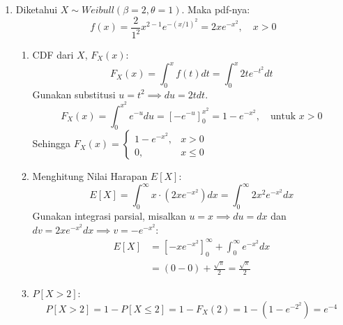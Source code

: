 \documentclass[11pt,letterpaper]{article}
\begin{document}
\begin{enumerate}
\begin{enumerate}[label=\alph*.]
                Maka, variansinya adalah:
                \[ Var(X) = E(X^2) - (E(X))^2 = 10 - (-3)^2 = 10 - 9 = 1. \]
        \end{enumerate}
        \vspace{0.3cm}

  \item Diketahui $X \sim Weibull(\beta=2, \theta=1)$. Maka pdf-nya:
        \[ f(x) = \frac{2}{1^2} x^{2-1} e^{-(x/1)^2} = 2x e^{-x^2}, \quad x > 0 \]
        \begin{enumerate}[label=\alph*.]
          \item CDF dari $X$, $F_X(x)$:
                \[ F_X(x) = \int_{0}^{x} f(t) dt = \int_{0}^{x} 2t e^{-t^2} dt \]
                Gunakan substitusi $u = t^2 \implies du = 2t dt$.
                \[ F_X(x) = \int_{0}^{x^2} e^{-u} du = \left[-e^{-u}\right]_{0}^{x^2} = 1 - e^{-x^2}, \quad \text{untuk } x > 0 \]
                Sehingga $F_X(x) = \begin{cases} 1 - e^{-x^2}, & x > 0 \\ 0, & x \le 0 \end{cases}$
          \item Menghitung Nilai Harapan $E[X]$:
                \[ E[X] = \int_{0}^{\infty} x \cdot (2x e^{-x^2}) dx = \int_{0}^{\infty} 2x^2 e^{-x^2} dx \]
                Gunakan integrasi parsial, misalkan $u = x \implies du = dx$ dan $dv = 2x e^{-x^2} dx \implies v = -e^{-x^2}$:
                \begin{align*}
                  E[X] & = \left[ -x e^{-x^2} \right]_0^\infty + \int_{0}^{\infty} e^{-x^2} dx \\
                       & = (0 - 0) + \frac{\sqrt{\pi}}{2} = \frac{\sqrt{\pi}}{2}
                \end{align*}
          \item $P[X > 2]$:
                \[ P[X > 2] = 1 - P[X \le 2] = 1 - F_X(2) = 1 - (1 - e^{-2^2}) = e^{-4} \]
        \end{enumerate}
        \vspace{0.3cm}


\end{enumerate}
\end{document}
